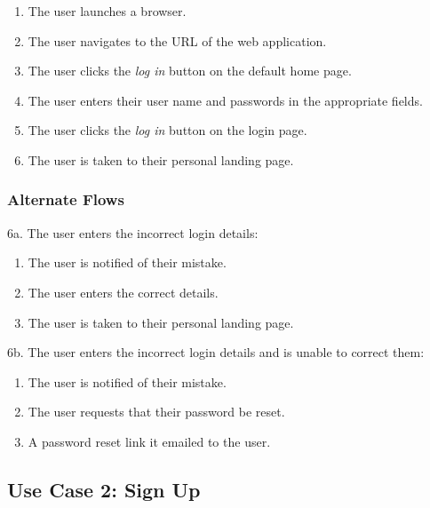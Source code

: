 \documentclass[12pt,onecolumn]{article}
\begin{document}
		\begin{enumerate}
			\item The user launches a browser.

			\item The user navigates to the URL of the web application.

			\item The user clicks the \emph{log in} button on the default home page.

			\item The user enters their user name and passwords in the appropriate fields.

			\item The user clicks the \emph{log in} button on the login page.

			\item The user is taken to their personal landing page.

		\end{enumerate}

		\subsubsection{Alternate Flows}

		6a. The user enters the incorrect login details:

		\begin{enumerate}
			\item The user is notified of their mistake.

			\item The user enters the correct details.

			\item The user is taken to their personal landing page.
		\end{enumerate}
		
		6b. The user enters the incorrect login details and is unable to correct them:

		\begin{enumerate}
			\item The user is notified of their mistake.

			\item The user requests that their password be reset.

			\item A password reset link it emailed to the user.
		\end{enumerate}

	\subsection{Use Case 2: Sign Up}
\end{document}
